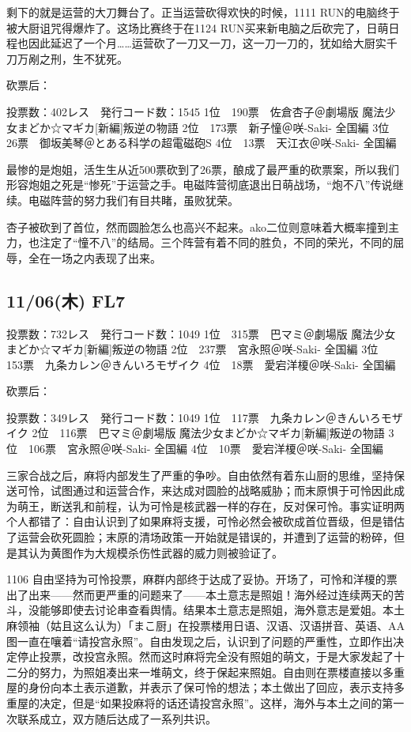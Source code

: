 剩下的就是运营的大刀舞台了。正当运营砍得欢快的时候，1111 RUN的电脑终于被大厨诅咒得爆炸了。这场比赛终于在1124 RUN买来新电脑之后砍完了，日萌日程也因此延迟了一个月……运营砍了一刀又一刀，这一刀一刀的，犹如给大厨实千刀万剐之刑，生不犹死。

砍票后：

    投票数：402レス　発行コード数：1545
    1位　190票　佐倉杏子＠劇場版 魔法少女まどか☆マギカ[新編]叛逆の物語
    2位　173票　新子憧＠咲-Saki- 全国編
    3位　26票　御坂美琴＠とある科学の超電磁砲S
    4位　13票　天江衣＠咲-Saki- 全国編

最惨的是炮姐，活生生从近500票砍到了26票，酿成了最严重的砍票案，所以我们形容炮姐之死是“惨死”于运营之手。电磁阵营彻底退出日萌战场，“炮不八”传说继续。电磁阵营的努力我们有目共睹，虽败犹荣。

杏子被砍到了首位，然而圆脸怎么也高兴不起来。ako二位则意味着大概率撞到主力，也注定了“憧不八”的结局。三个阵营有着不同的胜负，不同的荣光，不同的屈辱，全在一场之内表现了出来。

\subsection{11/06(木) FL7}

    投票数：732レス　発行コード数：1049
    1位　315票　巴マミ＠劇場版 魔法少女まどか☆マギカ[新編]叛逆の物語
    2位　237票　宮永照＠咲-Saki- 全国編
    3位　153票　九条カレン＠きんいろモザイク
    4位　18票　愛宕洋榎＠咲-Saki- 全国編

砍票后：

    投票数：349レス　発行コード数：1049
    1位　117票　九条カレン＠きんいろモザイク
    2位　116票　巴マミ＠劇場版 魔法少女まどか☆マギカ[新編]叛逆の物語
    3位　106票　宮永照＠咲-Saki- 全国編
    4位　10票　愛宕洋榎＠咲-Saki- 全国編

三家合战之后，麻将内部发生了严重的争吵。自由依然有着东山厨的思维，坚持保送可怜，试图通过和运营合作，来达成对圆脸的战略威胁；而末原惧于可怜因此成为萌王，断送乳和前程，认为可怜是核武器一样的存在，反对保可怜。事实证明两个人都错了：自由认识到了如果麻将支援，可怜必然会被砍成首位晋级，但是错估了运营会砍死圆脸；末原的清场政策一开始就是错误的，并遭到了运营的粉碎，但是其认为黄图作为大规模杀伤性武器的威力则被验证了。

1106 自由坚持为可怜投票，麻群内部终于达成了妥协。开场了，可怜和洋榎的票出了出来——然而更严重的问题来了——本土意志是照姐！海外经过连续两天的苦斗，没能够即使去讨论串查看舆情。结果本土意志是照姐，海外意志是爱姐。本土麻领袖（姑且这么认为）「まこ厨」在投票楼用日语、汉语、汉语拼音、英语、AA图一直在嚷着“请投宫永照”。自由发现之后，认识到了问题的严重性，立即作出决定停止投票，改投宫永照。然而这时麻将完全没有照姐的萌文，于是大家发起了十二分的努力，为照姐凑出来一堆萌文，终于保起来照姐。自由则在票楼直接以多重屋的身份向本土表示道歉，并表示了保可怜的想法；本土做出了回应，表示支持多重屋的决定，但是“如果投麻将的话还请投宫永照”。这样，海外与本土之间的第一次联系成立，双方随后达成了一系列共识。

